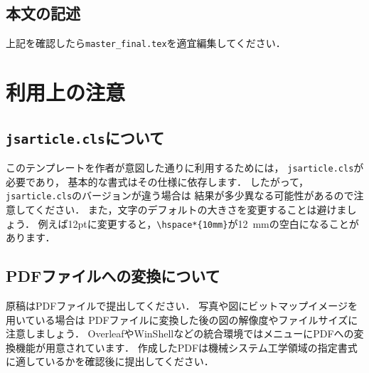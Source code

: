 \documentclass[twocolumn]{jsarticle}
\begin{document}
\subsection{本文の記述}
上記を確認したら\texttt{master\_final.tex}を適宜編集してください．


\section{利用上の注意}

\subsection{\texttt{jsarticle.cls}について}
このテンプレートを作者が意図した通りに利用するためには，
\texttt{jsarticle.cls}\cite{Okumura2023}が必要であり，
基本的な書式はその仕様に依存します．
したがって，\texttt{jsarticle.cls}のバージョンが違う場合は
結果が多少異なる可能性があるので注意してください．
また，文字のデフォルトの大きさを変更することは避けましょう．
例えば12ptに変更すると，\verb+\hspace*{10mm}+が12~mmの空白になることがあります．

\subsection{PDFファイルへの変換について}
原稿はPDFファイルで提出してください．
写真や図にビットマップイメージを用いている場合は
PDFファイルに変換した後の図の解像度やファイルサイズに注意しましょう．
OverleafやWinShellなどの統合環境ではメニューにPDFへの変換機能が用意されています．
作成したPDFは機械システム工学領域の指定書式に適しているかを確認後に提出してください．


%

\end{document}
